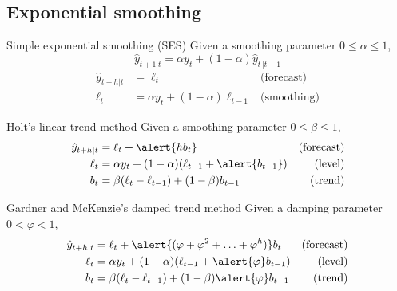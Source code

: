 \documentclass[12pt,aspectratio=169]{beamer}
\begin{document}
\subsection{Exponential smoothing}

\begin{frame}{Simple exponential smoothing (SES)}
    Given a smoothing parameter $0 \leq \alpha \leq 1$,
    \[
        \hat{y}_{t + 1 | t} = \alpha y_{t} + (1 - \alpha) \hat{y}_{t\,| t - 1}
    \]
    \vfill
    \begin{align*}
        \hat{y}_{t + h | t} &= \ell_{t}                               & \text{(forecast)} \\
        \ell_{t}            &= \alpha y_{t} + (1 - \alpha) \ell_{t-1} & \text{(smoothing)}
    \end{align*}
\end{frame}

\begin{frame}{Holt's linear trend method}
    Given a smoothing parameter $0 \leq \beta \leq 1$,
    \begin{align*}
        \hat{y}_{t + h | t} &= \ell_{t} + \alert{h b_{t}}                                 & \text{(forecast)} \\
        \ell_{t}            &= \alpha y_{t} + (1 - \alpha) (\ell_{t-1} + \alert{b_{t-1}}) & \text{(level)} \\
        b_{t}               &= \beta (\ell_{t} - \ell_{t-1}) + (1 - \beta) b_{t-1}        & \text{(trend)}
    \end{align*}
\end{frame}

\begin{frame}{Gardner and McKenzie's damped trend method}
    Given a damping parameter $0 < \varphi < 1$,
    \begin{align*}
        \hat{y}_{t + h | t} &= \ell_{t} + \alert{(\varphi + \varphi^{2} + \ldots + \varphi^{h})} b_{t} & \text{(forecast)} \\
        \ell_{t}            &= \alpha y_{t} + (1 - \alpha) (\ell_{t-1} + \alert{\varphi} b_{t-1})      & \text{(level)} \\
        b_{t}               &= \beta (\ell_{t} - \ell_{t-1}) + (1 - \beta) \alert{\varphi} b_{t-1}     & \text{(trend)}
    \end{align*}
\end{frame}
\end{document}
